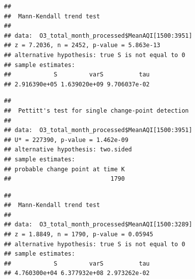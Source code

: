 \documentclass[12pt,]{article}
\newenvironment{Shaded}{\begin{snugshade}}{\end{snugshade}}
\newcommand{\KeywordTok}[1]{\textcolor[rgb]{0.13,0.29,0.53}{\textbf{#1}}}
\newcommand{\DecValTok}[1]{\textcolor[rgb]{0.00,0.00,0.81}{#1}}
\newcommand{\CommentTok}[1]{\textcolor[rgb]{0.56,0.35,0.01}{\textit{#1}}}
\newcommand{\OperatorTok}[1]{\textcolor[rgb]{0.81,0.36,0.00}{\textbf{#1}}}
\newcommand{\NormalTok}[1]{#1}
\begin{document}
\begin{verbatim}
## 
##  Mann-Kendall trend test
## 
## data:  O3_total_month_processed$MeanAQI[1500:3951]
## z = 7.2036, n = 2452, p-value = 5.863e-13
## alternative hypothesis: true S is not equal to 0
## sample estimates:
##            S         varS          tau 
## 2.916390e+05 1.639020e+09 9.706037e-02
\end{verbatim}

\begin{Shaded}
\end{Shaded}

\begin{verbatim}
## 
##  Pettitt's test for single change-point detection
## 
## data:  O3_total_month_processed$MeanAQI[1500:3951]
## U* = 227390, p-value = 1.462e-09
## alternative hypothesis: two.sided
## sample estimates:
## probable change point at time K 
##                            1790
\end{verbatim}

\begin{Shaded}
\end{Shaded}

\begin{verbatim}
## 
##  Mann-Kendall trend test
## 
## data:  O3_total_month_processed$MeanAQI[1500:3289]
## z = 1.8849, n = 1790, p-value = 0.05945
## alternative hypothesis: true S is not equal to 0
## sample estimates:
##            S         varS          tau 
## 4.760300e+04 6.377932e+08 2.973262e-02
\end{verbatim}

\begin{Shaded}
\end{Shaded}
\end{document}
